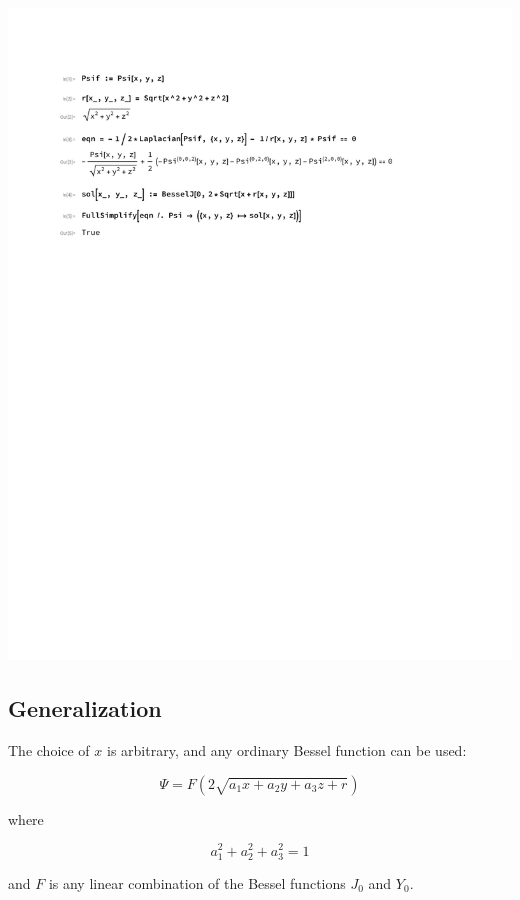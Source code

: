 \documentclass{article}
\begin{document}
\includegraphics[page=1, clip, trim=1in 7in 1in 1in, width=\textwidth]{improved.pdf}

\subsection*{Generalization}
\parskip 12pt

The choice of $x$ is arbitrary, and any ordinary Bessel function can be used:

\begin{equation}
\label{generalized solution}
\Psi = F(2\sqrt{a_1 x+ a_2 y+ a_3 z+r})
\end{equation}

where

\begin{equation*}
a_1^2+a_2^2+a_3^2=1
\end{equation*}

and $F$ is any linear combination of the Bessel functions $J_0$ and $Y_0$.

\vskip 12pt
\end{document}
